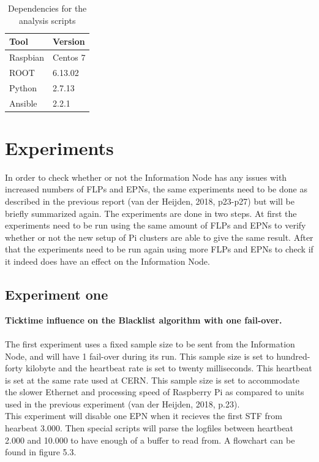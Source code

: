 \begin{table}[ht]
\begin{tabular}{| l | l |}
\hline
Tool & Version \\ \hline
Raspbian & Centos 7 \\ \hline
ROOT & 6.13.02 \\ \hline
Python & 2.7.13 \\ \hline
Ansible & 2.2.1 \\ \hline
\end{tabular}
\caption{Dependencies for the analysis scripts}
\end{table}

\newpage

\section{Experiments}
In order to check whether or not the Information Node has any issues with increased numbers of FLPs and EPNs, the same experiments need to be done as described in the previous report (van der Heijden, 2018, p23-p27) but will be briefly summarized again. The experiments are done in two steps. At first the experiments need to be run using the same amount of FLPs and EPNs to verify whether or not the new setup of Pi clusters are able to give the same result. After that the experiments need to be run again using more FLPs and EPNs to check if it indeed does have an effect on the Information Node.

\subsection{Experiment one}
\textbf{Ticktime influence on the Blacklist algorithm with one fail-over.}
\\\\
The first experiment uses a fixed sample size to be sent from the Information Node, and will have 1 fail-over during its run. This sample size is set to hundred-forty kilobyte and 
the heartbeat rate is set to twenty milliseconds. This heartbeat is set at the same rate used at CERN. This sample size is set to accommodate the slower Ethernet and processing speed of Raspberry Pi as compared to units used in the previous experiment (van der Heijden, 2018, p.23). \\
This experiment will disable one EPN when it recieves the first STF from hearbeat 3.000. Then special scripts will parse the logfiles between heartbeat 2.000 and 10.000 to have enough of a buffer to read from. A flowchart can be found in figure 5.3.

